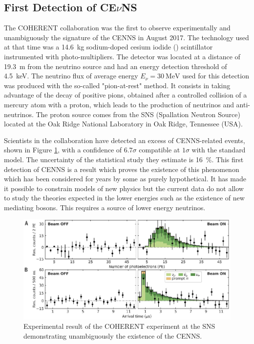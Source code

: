 \subsection{First Detection of CE$\nu$NS}

The COHERENT collaboration was the first to observe experimentally and unambiguously the signature of the CENNS in August 2017.
The technology used at that time was a \SI{14.6}{\kg} sodium-doped cesium iodide () scintillator instrumented with photo-multipliers. The detector was located at a distance of \SI{19.3}{\m} from the neutrino source and had an energy detection threshold of \SI{4.5}{\kilo\eV}. The neutrino flux of average energy $E_{\nu} = \SI{30}{\mega\eV}$ used for this detection was produced with the so-called "pion-at-rest" method. It consists in taking advantage of the decay of positive pions, obtained after a controlled collision of a mercury atom with a proton, which leads to the production of neutrinos and anti-neutrinos. The proton source comes from the SNS (Spallation Neutron Source) located at the Oak Ridge National Laboratory in Oak Ridge, Tennessee (USA). 

Scientists in the collaboration have detected an excess of CENNS-related events, shown in Figure \ref{fig:coherent-result}, with a confidence of $6.7\sigma$ compatible at $1\sigma$ with the standard model. The uncertainty of the statistical study they estimate is \SI{16}{\percent}. This first detection of CENNS is a result which proves the existence of this phenomenon which has been considered for years by some as purely hypothetical. It has made it possible to constrain models of new physics 
 but the current data do not allow to study the theories expected in the lower energies such as the existence of new mediating bosons.
This requires a source of lower energy neutrinos.

\begin{figure}
\centering
\includegraphics [scale=1]{Figures/Introduction/coherent_result.pdf}
\caption{Experimental result of the COHERENT experiment at the SNS demonstrating unambiguously the existence of the CENNS.}
\label{fig:coherent-result}
\end{figure}


